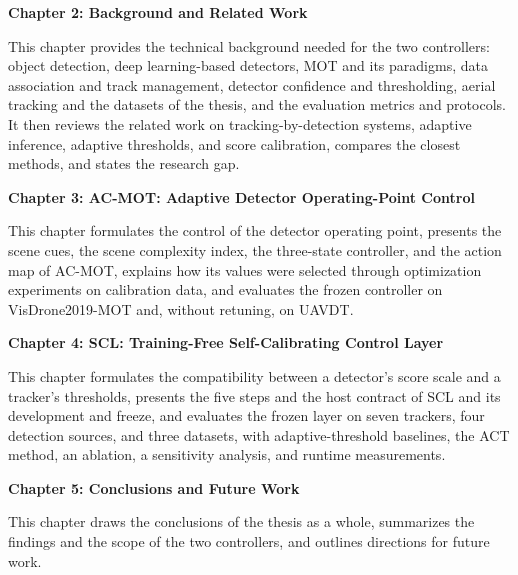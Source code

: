 \textbf{Chapter 2: Background and Related Work}

This chapter provides the technical background needed for the two controllers: object detection, deep learning-based detectors, MOT and its paradigms, data association and track management, detector confidence and thresholding, aerial tracking and the datasets of the thesis, and the evaluation metrics and protocols. It then reviews the related work on tracking-by-detection systems, adaptive inference, adaptive thresholds, and score calibration, compares the closest methods, and states the research gap.

\textbf{Chapter 3: AC-MOT: Adaptive Detector Operating-Point Control}

This chapter formulates the control of the detector operating point, presents the scene cues, the scene complexity index, the three-state controller, and the action map of AC-MOT, explains how its values were selected through optimization experiments on calibration data, and evaluates the frozen controller on VisDrone2019-MOT and, without retuning, on UAVDT.

\textbf{Chapter 4: SCL: Training-Free Self-Calibrating Control Layer}

This chapter formulates the compatibility between a detector's score scale and a tracker's thresholds, presents the five steps and the host contract of SCL and its development and freeze, and evaluates the frozen layer on seven trackers, four detection sources, and three datasets, with adaptive-threshold baselines, the ACT method, an ablation, a sensitivity analysis, and runtime measurements.

\textbf{Chapter 5: Conclusions and Future Work}

This chapter draws the conclusions of the thesis as a whole, summarizes the findings and the scope of the two controllers, and outlines directions for future work.
